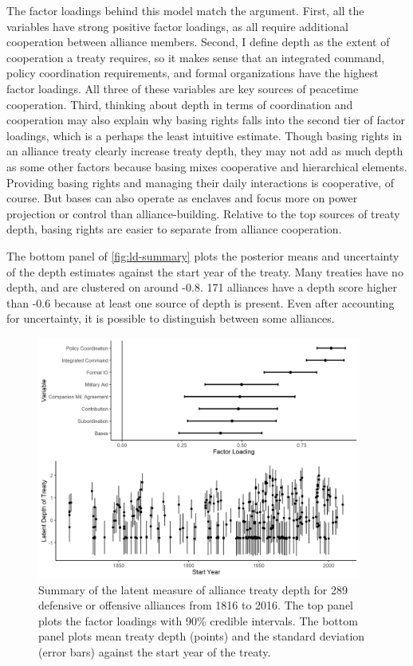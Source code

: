 \documentclass[12pt]{article}
\begin{document}
The factor loadings behind this model match the argument. 
First, all the variables have strong positive factor loadings, as all require additional cooperation between alliance members. 
Second, I define depth as the extent of cooperation a treaty requires, so it makes sense that an integrated command, policy coordination requirements, and formal organizations have the highest factor loadings. 
All three of these variables are key sources of peacetime cooperation. 
Third, thinking about depth in terms of coordination and cooperation may also explain why basing rights falls into the second tier of factor loadings, which is a perhaps the least intuitive estimate. 
Though basing rights in an alliance treaty clearly increase treaty depth, they may not add as much depth as some other factors because basing mixes cooperative and hierarchical elements. 
Providing basing rights and managing their daily interactions is cooperative, of course. 
But bases can also operate as enclaves and focus more on power projection or control than alliance-building.  
Relative to the top sources of treaty depth, basing rights are easier to separate from alliance cooperation. 


The bottom panel of \autoref{fig:ld-summary} plots the posterior means and uncertainty of the depth estimates against the start year of the treaty. 
Many treaties have no depth, and are clustered on around -0.8.  
171 alliances have a depth score higher than -0.6 because at least one source of depth is present. 
Even after accounting for uncertainty, it is possible to distinguish between some alliances. 


\begin{figure}
	\centering
		\includegraphics[width=0.95\textwidth]{../figures/ld-summary.png}
	\caption{Summary of the latent measure of alliance treaty depth for 289 defensive or offensive alliances from 1816 to 2016. The top panel plots the factor loadings with 90\% credible intervals. The bottom panel plots mean treaty depth (points) and the standard deviation (error bars) against the start year of the treaty.}
	\label{fig:ld-summary}
\end{figure}
\end{document}
